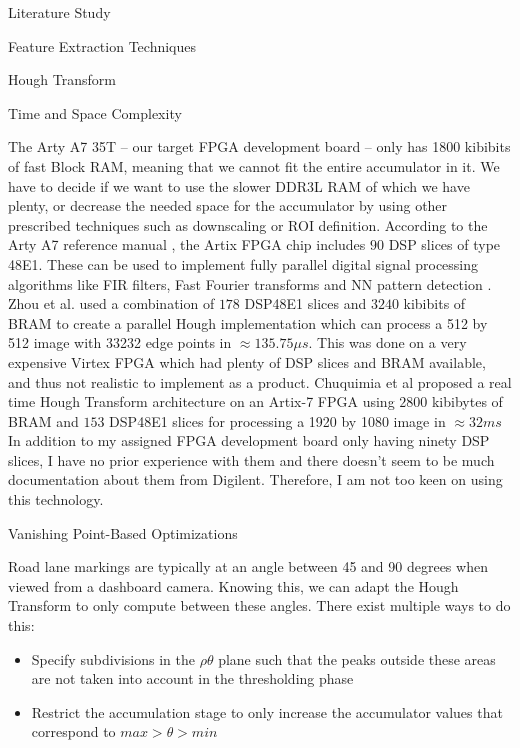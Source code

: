 \documentclass{matthijs}
\begin{document}
\begin{hoofdstuk}{Literature Study}
\begin{paragraaf}{Feature Extraction Techniques}
\begin{subparagraaf}{Hough Transform}
\begin{subsubparagraaf}{Time and Space Complexity}
					\bigskip

					The Arty A7 35T -- our target FPGA development board -- only has 1800 kibibits \cite{digilent2020arty} of fast Block RAM, meaning that we cannot fit the entire accumulator in it.
					We have to decide if we want to use the slower DDR3L RAM of which we have plenty, or decrease the needed space for the accumulator by using other prescribed techniques such as downscaling or ROI definition.
					According to the Arty A7 reference manual \cite{digilent2020arty}, the Artix FPGA chip includes $90$ DSP slices of type 48E1.
					These can be used to implement fully parallel digital signal processing algorithms like FIR filters, Fast Fourier transforms and NN pattern detection \cite{xilinx2018series}.
					Zhou et al. \cite{zhou2013efficient} used a combination of $178$ DSP48E1 slices and $3240$ kibibits of BRAM to create a parallel Hough implementation which can process a 512 by 512 image with 33232 edge points in $\approx 135.75 \mu s$.
					This was done on a very expensive Virtex FPGA which had plenty of DSP slices and BRAM available, and thus not realistic to implement as a product.
					Chuquimia et al \cite{chuquimia2018fpga} proposed a real time Hough Transform architecture on an Artix-7 FPGA using $2800$ kibibytes of BRAM and $153$ DSP48E1 slices for processing a 1920 by 1080 image in $\approx 32 ms$
					In addition to my assigned FPGA development board only having ninety DSP slices, I have no prior experience with them and there doesn't seem to be much documentation about them from Digilent.
					Therefore, I am not too keen on using this technology.

				\end{subsubparagraaf}

				\begin{subsubparagraaf}{Vanishing Point-Based Optimizations}

					Road lane markings are typically at an angle between 45 and 90 degrees when viewed from a dashboard camera.
					Knowing this, we can adapt the Hough Transform to only compute between these angles.
					There exist multiple ways to do this:

					\begin{itemize}

						\item Specify subdivisions in the $\rho\theta$ plane such that the peaks outside these areas are not taken into account in the thresholding phase \cite{solberg2009hough}
						\item Restrict the accumulation stage to only increase the accumulator values that correspond to $ max > \theta > min $ \cite{looges1993hough}
					\end{itemize}


\end{subsubparagraaf}
\end{subparagraaf}
\end{paragraaf}
\end{hoofdstuk}
\end{document}
